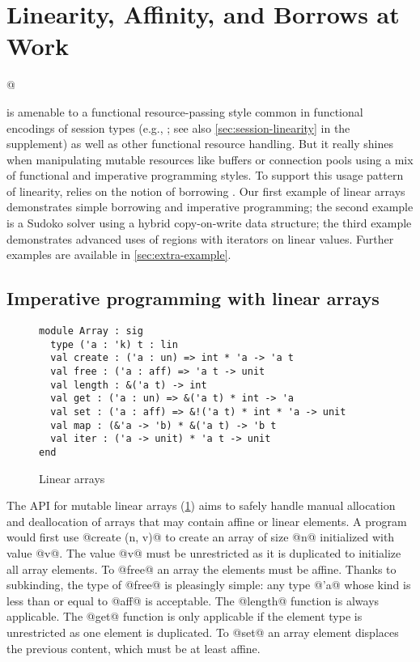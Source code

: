\section{Linearity, Affinity, and Borrows at Work}
\label{motivation}

\lstMakeShortInline[keepspaces,basicstyle=\small\ttfamily]@

\lang{} is amenable to a functional resource-passing style
common in functional encodings of session types (e.g.,
\cite{DBLP:journals/jfp/Padovani17}; see also
\cref{sec:session-linearity} in the supplement) as well as other
functional resource handling. But it really shines
when manipulating mutable resources like buffers or connection pools
using a mix of functional and imperative programming styles.
%
To support this usage pattern of linearity, \lang{} relies on
the notion of borrowing \cite{DBLP:conf/popl/BoylandR05}. Our first
example of linear arrays demonstrates simple borrowing and
imperative programming; the second example is a Sudoko solver using a
hybrid copy-on-write data structure; the third example demonstrates advanced uses
of regions with iterators on linear values.
Further examples are available in \cref{sec:extra-example}.

\subsection{Imperative programming with linear arrays}
\label{sec:imper-progr}

\begin{figure}[tp]
  \centering
\begin{lstlisting}[numbers=none]
module Array : sig
  type ('a : 'k) t : lin
  val create : ('a : un) => int * 'a -> 'a t
  val free : ('a : aff) => 'a t -> unit
  val length : &('a t) -> int
  val get : ('a : un) => &('a t) * int -> 'a
  val set : ('a : aff) => &!('a t) * int * 'a -> unit
  val map : (&'a -> 'b) * &('a t) -> 'b t
  val iter : ('a -> unit) * 'a t -> unit
end
\end{lstlisting}
  \vspace{-15pt}
  \caption{Linear arrays}
  \label{ex:array}
  \label{sig:array}
  \vspace{-10pt}
\end{figure}

The API for mutable linear arrays (\cref{sig:array})
aims to safely handle manual allocation and
deallocation of arrays that may contain affine or linear elements.
A program would first use @create (n, v)@ to create
an array of size @n@ initialized with value
@v@. The value @v@ must be unrestricted as it is duplicated to
initialize all array elements.
To @free@ an array the elements must be affine. Thanks to subkinding,
the type of @free@ is pleasingly simple: any type @'a@ whose kind is
less than or equal to @aff@ is acceptable. 
The @length@ function is always applicable.
The @get@ function is only applicable
if the element type is unrestricted as one element is duplicated.
To @set@ an array element displaces the previous content, which must
be at least affine.

